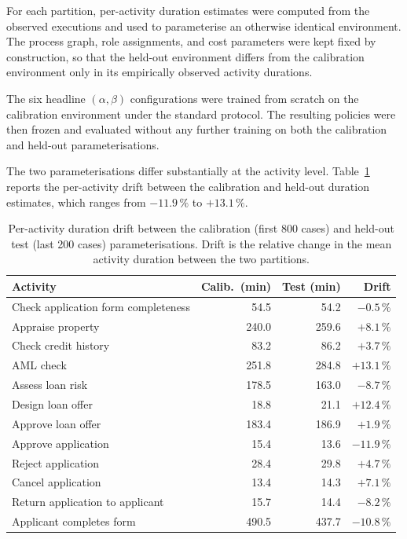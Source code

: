 For each partition, per-activity duration estimates were computed
from the observed executions and used to parameterise an otherwise
identical environment. The process graph, role assignments, and cost
parameters were kept fixed by construction, so that the held-out
environment differs from the calibration environment only in its
empirically observed activity durations.

The six headline $(\alpha,\beta)$ configurations were trained from
scratch on the calibration environment under the standard protocol.
The resulting policies were then frozen and evaluated without any
further training on both the calibration and held-out
parameterisations.

The two parameterisations differ substantially at the activity level.
Table~\ref{tab:duration_drift} reports the per-activity drift between
the calibration and held-out duration estimates, which ranges from
$-11.9\,\%$ to $+13.1\,\%$.

\begin{table}[H]
\centering
\caption{Per-activity duration drift between the calibration (first 800
cases) and held-out test (last 200 cases) parameterisations. Drift is
the relative change in the mean activity duration between the two
partitions.}
\label{tab:duration_drift}
\begin{tabular}{lrrr}
\toprule
\textbf{Activity} & \textbf{Calib.\ (min)} & \textbf{Test (min)} &
\textbf{Drift} \\
\midrule
Check application form completeness & 54.5  & 54.2  & $-0.5\,\%$ \\
Appraise property                   & 240.0 & 259.6 & $+8.1\,\%$ \\
Check credit history                & 83.2  & 86.2  & $+3.7\,\%$ \\
AML check                           & 251.8 & 284.8 & $+13.1\,\%$ \\
Assess loan risk                    & 178.5 & 163.0 & $-8.7\,\%$ \\
Design loan offer                   & 18.8  & 21.1  & $+12.4\,\%$ \\
Approve loan offer                  & 183.4 & 186.9 & $+1.9\,\%$ \\
Approve application                 & 15.4  & 13.6  & $-11.9\,\%$ \\
Reject application                  & 28.4  & 29.8  & $+4.7\,\%$ \\
Cancel application                  & 13.4  & 14.3  & $+7.1\,\%$ \\
Return application to applicant     & 15.7  & 14.4  & $-8.2\,\%$ \\
Applicant completes form            & 490.5 & 437.7 & $-10.8\,\%$ \\
\bottomrule
\end{tabular}
\end{table}

